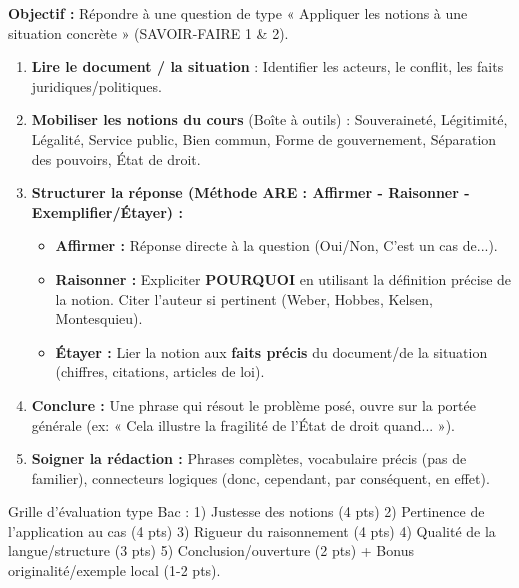 \documentclass[11pt]{article}
\newcommand{\cle}[1]{{\popxbold\color{popdark}#1}}
\begin{document}
\begin{methode}
\textbf{Objectif :} Répondre à une question de type « Appliquer les notions à une situation concrète » (SAVOIR-FAIRE 1 \& 2).
\begin{enumerate}
    \item \textbf{Lire le document / la situation} : Identifier les acteurs, le conflit, les faits juridiques/politiques.
    \item \textbf{Mobiliser les notions du cours} (Boîte à outils) : Souveraineté, Légitimité, Légalité, Service public, Bien commun, Forme de gouvernement, Séparation des pouvoirs, État de droit.
    \item \textbf{Structurer la réponse (Méthode ARE : Affirmer - Raisonner - Exemplifier/Étayer) :}
    \begin{itemize}
        \item \textbf{Affirmer :} Réponse directe à la question (Oui/Non, C'est un cas de...).
        \item \textbf{Raisonner :} Expliciter \textbf{POURQUOI} en utilisant la définition précise de la notion. Citer l'auteur si pertinent (Weber, Hobbes, Kelsen, Montesquieu).
        \item \textbf{Étayer :} Lier la notion aux \textbf{faits précis} du document/de la situation (chiffres, citations, articles de loi).
    \end{itemize}
    \item \textbf{Conclure :} Une phrase qui résout le problème posé, ouvre sur la portée générale (ex: « Cela illustre la fragilité de l'État de droit quand... »).
    \item \textbf{Soigner la rédaction :} Phrases complètes, vocabulaire précis (pas de familier), connecteurs logiques (donc, cependant, par conséquent, en effet).
\end{enumerate}
\cle{Grille d'évaluation type Bac :} 1) Justesse des notions (4 pts) 2) Pertinence de l'application au cas (4 pts) 3) Rigueur du raisonnement (4 pts) 4) Qualité de la langue/structure (3 pts) 5) Conclusion/ouverture (2 pts) + Bonus originalité/exemple local (1-2 pts).
\end{methode}
\end{document}
